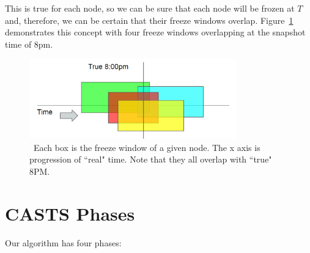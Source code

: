 This is true for each node, so we can be sure that each node will be
frozen at $T$ and, therefore, we can be certain that their freeze
windows overlap. Figure~\ref{fig:overlapping-windows} demonstrates
this concept with four freeze windows overlapping at the snapshot time
of 8pm.

\begin{figure}[!htbp]
  \centering
  \includegraphics[width=0.8\textwidth]{overlapping-windows.png}
  \caption{~Each box is the freeze window of a given node. The x axis is progression of ``real" time. Note that they all overlap with ``true" 8PM.}
  \label{fig:overlapping-windows}
\end{figure}


\section{CASTS Phases}
Our algorithm has four phases:

